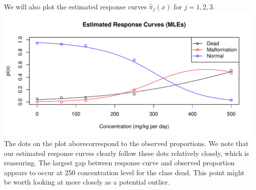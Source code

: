 \documentclass[12pt]{article}
\begin{document}
\begin{enumerate}
\begin{enumerate}
	We will also plot the estimated response curves $\hat{\pi}_j(x)$ for $j = 1, 2,3$. \\
	\newline
	\includegraphics[scale = .7]{plot13.pdf} \\
	The dots  on the plot abovecorrespond to the observed proportions. We note that our estimated response curves clearly follow these dots relatively closely, which is reassuring. The largest gap between response curve and observed proportion appears to occur at 250 concentration level for the class dead. This point might be worth looking at more closely as a potential outlier. 
	

\end{enumerate}
\end{enumerate}
\end{document}
